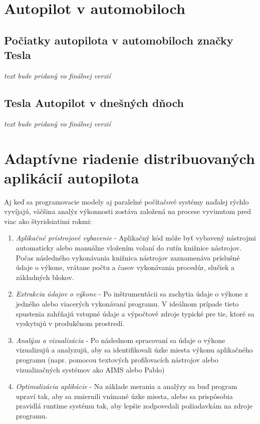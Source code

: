 \documentclass[10pt,twoside,slovak,a4paper]{article}
\begin{document}
\section{Autopilot v automobiloch}

\subsection{Počiatky autopilota v automobiloch značky Tesla} \label{PAVAZ}

\emph{text bude pridaný vo finálnej verzií}

\subsection{Tesla Autopilot v dnešných dňoch}

\emph{text bude pridaný vo finálnej verzií}

\section{Adaptívne riadenie distribuovaných aplikácií autopilota} \label{ARDAA}

Aj keď sa programovacie modely aj paralelné počítačové systémy naďalej rýchlo vyvíjajú, väčšina analýz výkonnosti zostáva založená na procese vyvinutom pred viac ako štyridsiatimi rokmi:

\begin{enumerate}
\item \emph{Aplikačné prístrojové vybavenie} - Aplikačný kód môže byť vybavený nástrojmi automaticky alebo manuálne vložením volaní do rutín knižnice nástrojov. Počas následného vykonávania knižnica nástrojov zaznamenáva príslušné údaje o výkone, vrátane počtu a časov vykonávania procedúr, slučiek a základných blokov.
\item\emph{Extrakcia údajov o výkone} - Po inštrumentácii sa zachytia údaje o výkone z jedného alebo viacerých vykonávaní programu. V ideálnom prípade tieto spustenia zahŕňajú vstupné údaje a výpočtové zdroje typické pre tie, ktoré sa vyskytujú v produkčnom prostredí.
\item\emph{Analýza a vizualizácia} - Po následnom spracovaní sa údaje o výkone vizualizujú a analyzujú, aby sa identifikovali úzke miesta výkonu aplikačného programu (napr. pomocou textových profilovacích nástrojov alebo vizualizačných systémov ako AIMS  alebo Pablo)
\item\emph{Optimalizácia aplikácie} - Na základe merania a analýzy sa buď program upraví tak, aby sa zmiernili vnímané úzke miesta, alebo sa prispôsobia pravidlá runtime systému tak, aby lepšie zodpovedali požiadavkám na zdroje programu. \cite{SoftverAutopilot}
\end{enumerate}
\end{document}
